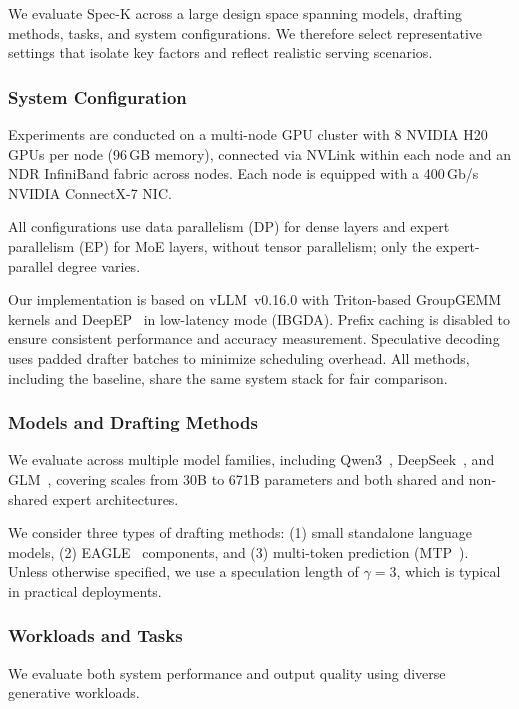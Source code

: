 \documentclass[conference]{IEEEtran}
\theoremstyle{definition} %
\begin{document}
We evaluate Spec-K across a large design space spanning models, drafting methods, tasks, and system configurations. 
We therefore select representative settings that isolate key factors and reflect realistic serving scenarios.

\subsubsection{System Configuration}

Experiments are conducted on a multi-node GPU cluster with 8 NVIDIA H20 GPUs per node (96\,GB memory), connected via NVLink within each node and an NDR InfiniBand fabric across nodes. Each node is equipped with a 400\,Gb/s NVIDIA ConnectX-7 NIC.

All configurations use data parallelism (DP) for dense layers and expert parallelism (EP) for MoE layers, without tensor parallelism; only the expert-parallel degree varies.

Our implementation is based on vLLM~v0.16.0 with Triton-based GroupGEMM kernels and DeepEP~\cite{deepep2025} in low-latency mode (IBGDA). Prefix caching is disabled to ensure consistent performance and accuracy measurement. Speculative decoding uses padded drafter batches to minimize scheduling overhead. All methods, including the baseline, share the same system stack for fair comparison.

\subsubsection{Models and Drafting Methods}

We evaluate across multiple model families, including Qwen3~\cite{yang2025qwen3}, DeepSeek~\cite{liu2024deepseek}, and GLM~\cite{zeng2025glm}, covering scales from 30B to 671B parameters and both shared and non-shared expert architectures.

We consider three types of drafting methods: (1) small standalone language models, (2) EAGLE~\cite{li2024eagle} components, and (3) multi-token prediction (MTP~\cite{gloeckle2024better}). Unless otherwise specified, we use a speculation length of $\gamma = 3$, which is typical in practical deployments.

\subsubsection{Workloads and Tasks}

We evaluate both system performance and output quality using diverse generative workloads.
\end{document}
